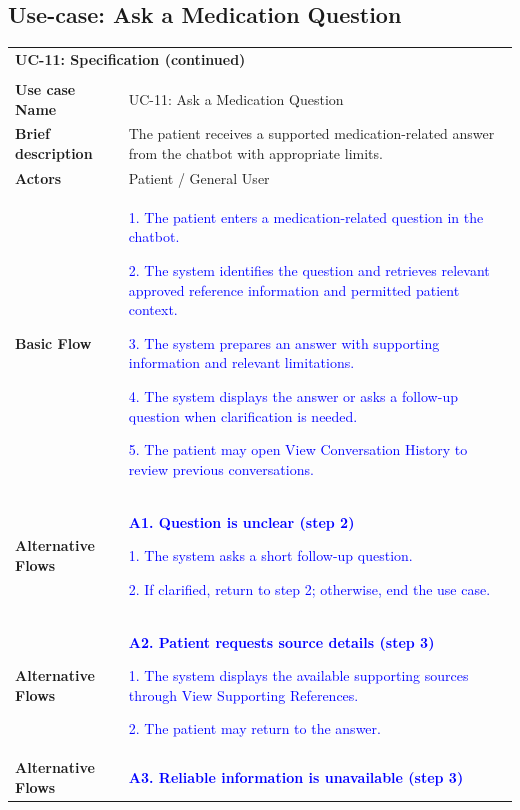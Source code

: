 \subsection{Use-case: Ask a Medication Question}
\label{uc:uc-11}
\begin{longtable}{|p{}|p{}|}
\hline
\endfirsthead
\multicolumn{2}{l}{\textbf{UC-11: Specification (continued)}}\\\\
\hline
\endhead
\textbf{Use case Name} & UC-11: Ask a Medication Question \\ \hline
\textbf{Brief description} &
The patient receives a supported medication-related answer from the chatbot with appropriate limits.
\\ \hline
\textbf{Actors} & Patient / General User \\ \hline
\textbf{Basic Flow} &
\textcolor{blue}{1. The patient enters a medication-related question in the chatbot.}\par
\textcolor{blue}{2. The system identifies the question and retrieves relevant approved reference information and permitted patient context.}\par
\textcolor{blue}{3. The system prepares an answer with supporting information and relevant limitations.}\par
\textcolor{blue}{4. The system displays the answer or asks a follow-up question when clarification is needed.}\par
\textcolor{blue}{5. The patient may open View Conversation History to review previous conversations.}
\\ \hline
\textbf{Alternative Flows} &
\textcolor{blue}{\textbf{A1. Question is unclear (step 2)}}\par
\textcolor{blue}{1. The system asks a short follow-up question.}\par
\textcolor{blue}{2. If clarified, return to step 2; otherwise, end the use case.}
\\ \hline
\textbf{Alternative Flows} &
\textcolor{blue}{\textbf{A2. Patient requests source details (step 3)}}\par
\textcolor{blue}{1. The system displays the available supporting sources through View Supporting References.}\par
\textcolor{blue}{2. The patient may return to the answer.}
\\ \hline
\textbf{Alternative Flows} &
\textcolor{blue}{\textbf{A3. Reliable information is unavailable (step 3)}}\par

\end{longtable}
